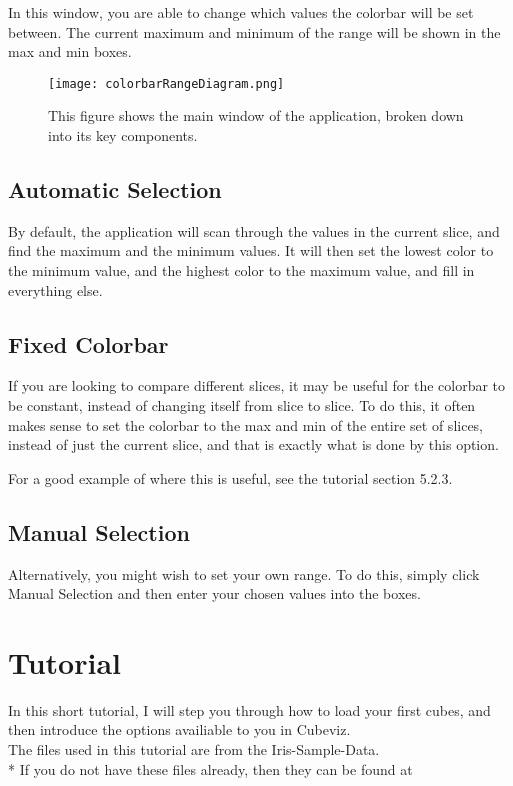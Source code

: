 \documentclass[a4paper,12pt]{article}
\begin{document}
In this window, you are able to change which values the colorbar will be set
between.  The current maximum and minimum of the range will be shown in the
max and min boxes.

\begin{figure}[h]
\centering
\texttt{[image: colorbarRangeDiagram.png]}
\caption{This figure shows the main window of the application, broken down into
its key components.}
\label{overflow}
\end{figure}

\subsection{Automatic Selection}

By default, the application will scan through the values in the current slice,
and find the maximum and the minimum values. It will then set the lowest color
to the minimum value, and the highest color to the maximum value, and fill
in everything else.

\subsection{Fixed Colorbar}

If you are looking to compare different slices, it may be useful for the
colorbar to be constant, instead of changing itself from slice to slice. To
do this, it often makes sense to set the colorbar to the max and min of the
entire set of slices, instead of just the current slice, and that is exactly
what is done by this option.

For a good example of where this is useful, see the tutorial section 5.2.3.

\subsection{Manual Selection}

Alternatively, you might wish to set your own range. To do this, simply click
Manual Selection and then enter your chosen values into the boxes.

\pagebreak

\section{Tutorial}

In this short tutorial, I will step you through how to load your first cubes,
\vspace{4mm}and then introduce the options availiable to you in Cubeviz. \\
\vspace{4mm}The files used in this tutorial are from the Iris-Sample-Data. \\*
If you do not have these files already, then they can be found at
\end{document}
